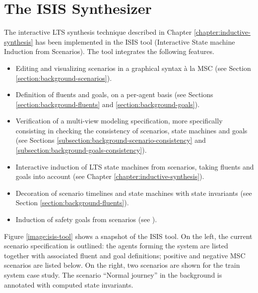 \section{The ISIS Synthesizer\label{section:tool-support-isis}}

The interactive LTS synthesis technique described in Chapter \ref{chapter:inductive-synthesis} has been implemented in the ISIS tool (Interactive State machine Induction from Scenarios). The tool integrates the following features.

\begin{itemize}
\item Editing and visualizing scenarios in a graphical syntax \`a la MSC (see Section \ref{section:background-scenarios}).
\item Definition of fluents and goals, on a per-agent basis (see Sections \ref{section:background-fluents} and \ref{section:background-goals}).
\item Verification of a multi-view modeling specification, more specifically consisting in checking the consistency of scenarios, state machines and goals (see Sections \ref{subsection:background-scenario-consistency} and \ref{subsection:background-goals-consistency}).
\item Interactive induction of LTS state machines from scenarios, taking fluents and goals into account (see Chapter \ref{chapter:inductive-synthesis}).
\item Decoration of scenario timelines and state machines with state invariants (see Section \ref{section:background-fluents}).
\item Induction of safety goals from scenarios (see \cite{Damas:2011}).
\end{itemize}

Figure \ref{image:isis-tool} shows a snapshot of the ISIS tool. On the left, the current scenario specification is outlined: the agents forming the system are listed together with associated fluent and goal definitions; positive and negative MSC scenarios are listed below. On the right, two scenarios are shown for the train system case study. The scenario ``Normal journey'' in the background is annotated with computed state invariants.

